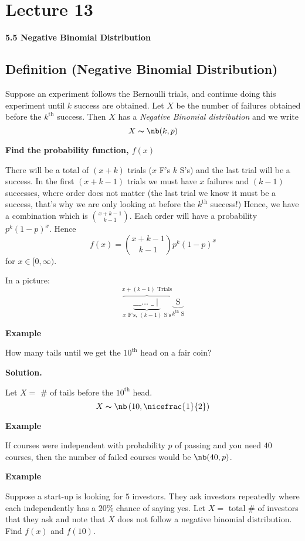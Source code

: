 \section{Lecture 13}

\textbf{5.5 Negative Binomial Distribution}
\begin{defbox}
    \subsection{Definition (Negative Binomial Distribution)}
    Suppose an experiment follows the Bernoulli trials, and continue
    doing this experiment until $ k $ success are obtained. Let $ X $
    be the number of failures obtained before the $ k^{\text{th}} $
    success. Then $ X $ has a \emph{Negative Binomial distribution}
    and we write
    \[ X \thicksim \nb(k,p) \]
\end{defbox}

\textbf{Find the probability function, $ f(x)$}

There will be a total of $ (x+k) $ trials ($ x $ F's $ k $ S's)
and the last trial will be a success. In the first $ (x+k-1) $ trials
we must have $ x $ failures and $ (k-1) $ successes, where order does not matter
(the last trial we know it must be a success, that's why we are only looking at
before the $ k^{\text{th}} $ success!)
Hence, we have a combination which is $ \binom{x+k-1}{k-1} $. Each order
will have a probability $ p^k(1-p)^x $. Hence
\[ f(x)=\binom{x+k-1}{k-1}p^k(1-p)^x \]
for $ x\in[0,\infty) $.

In a picture:
\[\overbrace{
    \underbrace{
        \text{\_ \_ \_ $\ldots$ \_}\mid}
        _{x \text{ F's},\,(k-1) \text{ S's}}}^{x+(k-1)\text{ Trials}}
\underbrace{ \text{ S } }_{ k^{\text{th}} \text{ S}} \]

\textbf{Example}

How many tails until we get the $10^{\text{th}}$ head on a fair coin?

\textbf{Solution.}

Let $ X= $ \# of tails before the $ 10^{\text{th}} $ head.
\[ X\thicksim\nb\left(10,\nicefrac{1}{2}\right) \]

\textbf{Example}

If courses were independent with probability $ p $ of passing
and you need $ 40 $ courses, then the number of failed courses
would be $ \nb(40,p) $.

\textbf{Example}

Suppose a start-up is looking for $ 5 $ investors. They ask
investors repeatedly where each independently has a $ 20\% $ chance
of saying yes. Let $ X= $ total \# of investors that they ask and
note that $ X $ does not follow a negative binomial distribution.
Find $ f(x) $ and $ f(10) $.

